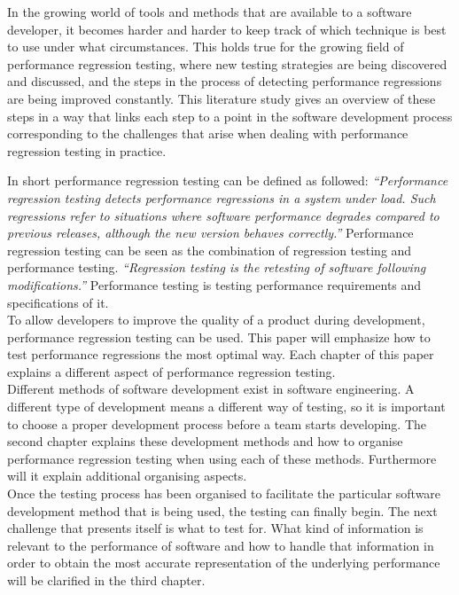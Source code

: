 In the growing world of tools and methods that are available to a software developer, it becomes harder and harder to keep track of which technique is best to use under what circumstances. This holds true for the growing field of performance regression testing, where new testing strategies are being discovered and discussed, and the steps in the process of detecting performance regressions are being improved constantly. This literature study gives an overview of these steps in a way that links each step to a point in the software development process corresponding to the challenges that arise when dealing with performance regression testing in practice.

In short performance regression testing can be defined as followed: \textit{``Performance regression testing detects performance
regressions in a system under load. Such regressions refer to
situations where software performance degrades compared to
previous releases, although the new version behaves correctly.''\cite{foo2010mining}}
Performance regression testing can be seen as the combination of regression testing and performance testing. \textit{``Regression testing is the retesting of software following modifications.''\cite{rothermel2001prioritizing}} Performance testing is testing performance requirements and specifications of it.\cite{gan2006software} \\

To allow developers to improve the quality of a product during development, performance regression testing can be used. This paper will emphasize how to test performance regressions the most optimal way. Each chapter of this paper explains a different aspect of performance regression testing. \\ 

Different methods of software development exist in software engineering. A different type of development means a different way of testing, so it is important to choose a proper development process before a team starts developing. The second chapter explains these development methods and how to organise performance regression testing when using each of these methods. Furthermore will it explain additional organising aspects. \\

Once the testing process has been organised to facilitate the particular software development method that is being used, the testing can finally begin. The next challenge that presents itself is what to test for. What kind of information is relevant to the performance of software and how to handle that information in order to obtain the most accurate representation of the underlying performance will be clarified in the third chapter. \\


